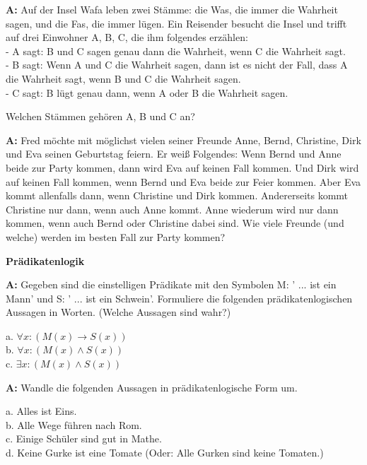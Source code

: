 \documentclass[landscape,twocolumn,a4paper]{article}
\begin{document}
\textbf{A:} 
Auf der Insel Wafa leben zwei Stämme: die Was, die immer die Wahrheit sagen, und die Fas, die immer lügen. Ein Reisender besucht die Insel und trifft auf drei Einwohner A, B, C, die ihm folgendes erzählen: \\

- A sagt: B und C sagen genau dann die Wahrheit, wenn C die Wahrheit sagt. \\
- B sagt: Wenn A und C die Wahrheit sagen, dann ist es nicht der Fall, dass A die Wahrheit sagt, wenn B und C die Wahrheit sagen. \\
- C sagt: B lügt genau dann, wenn A oder B die Wahrheit sagen.

Welchen Stämmen gehören A, B und C an?
\bigskip {} 

\textbf{A:} 
Fred möchte mit möglichst vielen seiner Freunde Anne, Bernd, Christine,
Dirk und Eva seinen Geburtstag feiern. Er weiß Folgendes:
Wenn Bernd und Anne beide zur Party kommen, dann wird Eva auf keinen
Fall kommen. Und Dirk wird auf keinen Fall kommen, wenn Bernd und Eva
beide zur Feier kommen. Aber Eva kommt allenfalls dann, wenn Christine
und Dirk kommen. Andererseits kommt Christine nur dann, wenn auch
Anne kommt. Anne wiederum wird nur dann kommen, wenn auch Bernd
oder Christine dabei sind.
Wie viele Freunde (und welche) werden im besten Fall zur Party
kommen?
\bigskip {}



\textbf{Prädikatenlogik}
\bigskip

\textbf{A:} 
Gegeben sind die einstelligen Prädikate mit den Symbolen M: ' ...  ist ein Mann'  und S: '  ... ist ein 
Schwein'. Formuliere die folgenden prädikatenlogischen Aussagen in Worten. (Welche Aussagen sind wahr?)

a. $\forall x : (M(x) \rightarrow S(x))$ \\
b. $\forall x : (M(x) \land S(x))$ \\
c. $\exists x : (M(x) \land S(x))$ 

\bigskip {}

\textbf{A:} 
Wandle die folgenden Aussagen in prädikatenlogische Form um.

a. Alles ist Eins. \\
b. Alle Wege führen nach Rom. \\
c. Einige Schüler sind gut in Mathe. \\
d. Keine Gurke ist eine Tomate (Oder: Alle Gurken sind keine Tomaten.)
\bigskip {}
\end{document}

